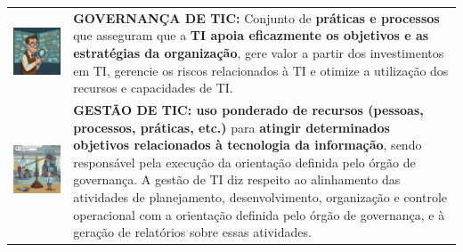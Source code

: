 \documentclass[
]{book}
\begin{document}
\begin{longtable}[]{@{}
  >{\raggedright\arraybackslash}p{}
  >{\raggedright\arraybackslash}p{}@{}}
\toprule\noalign{}
\endhead
\bottomrule\noalign{}
\endlastfoot
\includegraphics[width=1.94792in,height=\textheight]{images/cobit/01-governanca-ti.jpg} & \textbf{GOVERNANÇA DE TIC:} Conjunto de \textbf{práticas e processos} que asseguram que a \textbf{TI apoia eficazmente os objetivos e as estratégias da organização}, gere valor a partir dos investimentos em TI, gerencie os riscos relacionados à TI e otimize a utilização dos recursos e capacidades de TI. \\
\includegraphics{images/cobit/02-gestao-tic.jpg} & \textbf{GESTÃO DE TIC: uso ponderado de recursos (pessoas, processos, práticas, etc.)} para \textbf{atingir determinados objetivos relacionados à tecnologia da informação}, sendo responsável pela execução da orientação definida pelo órgão de governança. A gestão de TI diz respeito ao alinhamento das atividades de planejamento, desenvolvimento, organização e controle operacional com a orientação definida pelo órgão de governança, e à geração de relatórios sobre essas atividades. \\
\end{longtable}
\end{document}
